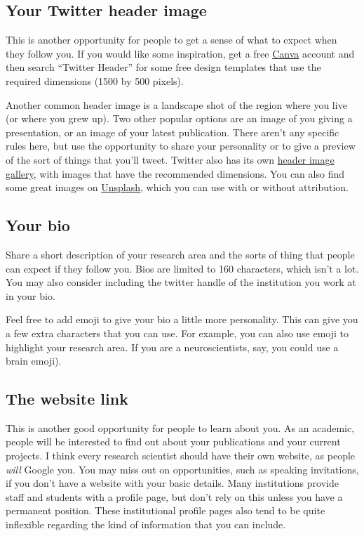 \documentclass[
]{book}
\begin{document}
\hypertarget{your-twitter-header-image}{%
\subsection{Your Twitter header image}\label{your-twitter-header-image}}

This is another opportunity for people to get a sense of what to expect when they follow you. If you would like some inspiration, get a free \href{https://canva.com/}{Canva} account and then search ``Twitter Header'' for some free design templates that use the required dimensions (1500 by 500 pixels).

Another common header image is a landscape shot of the region where you live (or where you grew up). Two other popular options are an image of you giving a presentation, or an image of your latest publication. There aren't any specific rules here, but use the opportunity to share your personality or to give a preview of the sort of things that you'll tweet. Twitter also has its own \href{https://www.flickr.com/photos/twitteroffice/sets/72157643560484885/}{header image gallery}, with images that have the recommended dimensions. You can also find some great images on \href{https://unsplash.com}{Unsplash}, which you can use with or without attribution.

\hypertarget{your-bio}{%
\subsection{Your bio}\label{your-bio}}

Share a short description of your research area and the sorts of thing that people can expect if they follow you. Bios are limited to 160 characters, which isn't a lot. You may also consider including the twitter handle of the institution you work at in your bio.

Feel free to add emoji to give your bio a little more personality. This can give you a few extra characters that you can use. For example, you can also use emoji to highlight your research area. If you are a neuroscientists, say, you could use a brain emoji).

\hypertarget{the-website-link}{%
\subsection{The website link}\label{the-website-link}}

This is another good opportunity for people to learn about you. As an academic, people will be interested to find out about your publications and your current projects. I think every research scientist should have their own website, as people \emph{will} Google you. You may miss out on opportunities, such as speaking invitations, if you don't have a website with your basic details. Many institutions provide staff and students with a profile page, but don't rely on this unless you have a permanent position. These institutional profile pages also tend to be quite inflexible regarding the kind of information that you can include.
\end{document}
